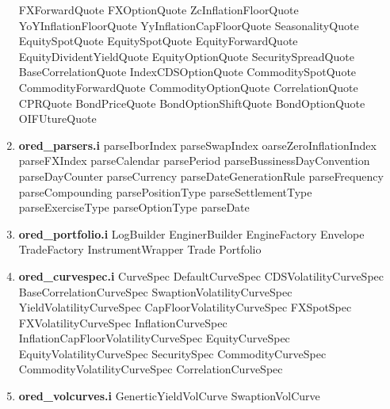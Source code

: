 \documentclass[10pt]{article}
\begin{document}
\begin{multicols}{2}
\begin{enumerate}
                \subitem FXForwardQuote
                \subitem FXOptionQuote
                \subitem ZcInflationFloorQuote
                \subitem YoYInflationFloorQuote
                \subitem YyInflationCapFloorQuote
                \subitem SeasonalityQuote
                \subitem EquitySpotQuote
                \subitem EquitySpotQuote
                \subitem EquityForwardQuote
                \subitem EquityDividentYieldQuote
                \subitem EquityOptionQuote
                \subitem SecuritySpreadQuote
                \subitem BaseCorrelationQuote
                \subitem IndexCDSOptionQuote
                \subitem CommoditySpotQuote
                \subitem CommodityForwardQuote
                \subitem CommodityOptionQuote
                \subitem CorrelationQuote
                \subitem CPRQuote
                \subitem BondPriceQuote
                \subitem BondOptionShiftQuote
                \subitem BondOptionQuote
                \subitem OIFUtureQuote
            \item \textbf{ored\_parsers.i}
                \subitem parseIborIndex
                \subitem parseSwapIndex
                \subitem oarseZeroInflationIndex
                \subitem parseFXIndex
                \subitem parseCalendar
                \subitem parsePeriod
                \subitem parseBussinessDayConvention
                \subitem parseDayCounter
                \subitem parseCurrency
                \subitem parseDateGenerationRule
                \subitem parseFrequency
                \subitem parseCompounding
                \subitem parsePositionType
                \subitem parseSettlementType
                \subitem parseExerciseType
                \subitem parseOptionType
                \subitem parseDate
             \item \textbf{ored\_portfolio.i}
                \subitem LogBuilder
                \subitem EnginerBuilder
                \subitem EngineFactory
                \subitem Envelope
                \subitem TradeFactory
                \subitem InstrumentWrapper
                \subitem Trade
                \subitem Portfolio
                \columnbreak
            \item \textbf{ored\_curvespec.i}
                \subitem CurveSpec
                \subitem DefaultCurveSpec
                \subitem CDSVolatilityCurveSpec
                \subitem BaseCorrelationCurveSpec
                \subitem SwaptionVolatilityCurveSpec
                \subitem YieldVolatilityCurveSpec
                \subitem CapFloorVolatilityCurveSpec
                \subitem FXSpotSpec
                \subitem FXVolatilityCurveSpec
                \subitem InflationCurveSpec
                \subitem InflationCapFloorVolatilityCurveSpec
                \subitem EquityCurveSpec
                \subitem EquityVolatilityCurveSpec
                \subitem SecuritySpec
                \subitem CommodityCurveSpec
                \subitem CommodityVolatilityCurveSpec
                \subitem CorrelationCurveSpec
            \item \textbf{ored\_volcurves.i}
                \subitem GenerticYieldVolCurve
                \subitem SwaptionVolCurve



\end{enumerate}
\end{multicols}
\end{document}
